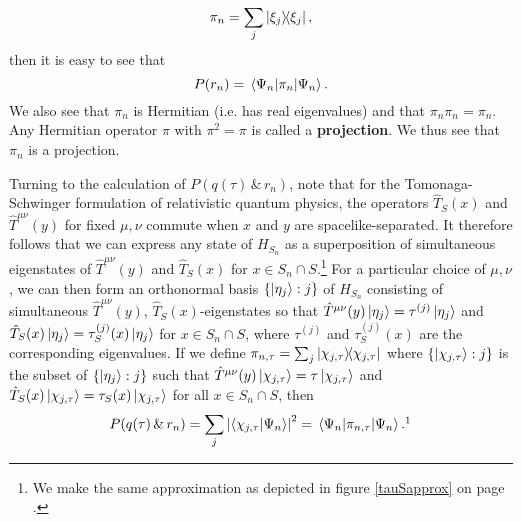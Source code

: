 \begin{equation}\label{tauprojection}
\pi_n=\sum_j\dyad{\xi_j},
\end{equation}
then it is easy to see that
\begin{equation}\label{Prn}
	P(r_n)=\ev*{\pi_n}{\Psi_n}.
\end{equation}
We also see that $\pi_n$ is Hermitian (i.e. has real eigenvalues) and that $\pi_n \pi_n = \pi_n$. Any Hermitian operator $\pi$ with $\pi^2=\pi$ is called a \textbf{projection}. We thus see that $\pi_n$ is a projection.

Turning to the calculation of $P(q(\tau)\, \& \, r_n)$, note that for the Tomonaga-Schwinger formulation of relativistic quantum physics, the operators $\hat{T}_S(x)$ and $\hat{T}^{\mu\nu}(y)$ for fixed $\mu,\nu$ commute when $x$ and $y$ are spacelike-separated. It therefore follows that we can express any state of $H_{S_n}$ as a superposition of simultaneous eigenstates of $\hat{T}^{\mu\nu}(y)$ and $\hat{T}_S(x)$ for $x\in S_n\cap S$.\footnote{We make the same approximation as depicted in figure \ref{tauSapprox} on page \pageref{tauSapprox}.}  For a particular choice of $\mu,\nu$, we can then form an orthonormal basis $\{\ket{\eta_j}:j\}$ of $H_{S_n}$ consisting of simultaneous $\hat{T}^{\mu\nu}(y)$, $\hat{T}_S(x)$-eigenstates so that $\hat{T}^{\mu\nu}(y)\ket{\eta_j}=\tau^{(j)}\ket{\eta_j}$ and $\hat{T}_{S}(x)\ket{\eta_j}=\tau_S^{(j)}(x)\ket{\eta_j}$ for $x\in S_n\cap S$, where $\tau^{(j)}$ and $\tau_S^{(j)}(x)$ are the corresponding eigenvalues. If we define  $\pi_{n,\tau}=\sum_j\dyad{\chi_{j,\tau}}$ where $\{\ket{\chi_{j,\tau}}:j\}$ is the subset of $\{\ket{\eta_j}:j\}$ such that $\hat{T}^{\mu\nu}(y)\ket{\chi_{j,\tau}}=\tau\ket{\chi_{j,\tau}}$ and $\hat{T}_S(x)\ket{\chi_{j,\tau}}=\tau_S(x)\ket{\chi_{j,\tau}}$ for all $x\in S_n\cap S$, then 
\begin{equation}\label{pqtauri}
P(q(\tau)\, \& \,r_n)=\sum_j \abs{ \ip{\chi_{j,\tau}}{\Psi_n}}^2=\ev*{\pi_{n,\tau}}{\Psi_n}.\protect\footnotemark
\end{equation}

